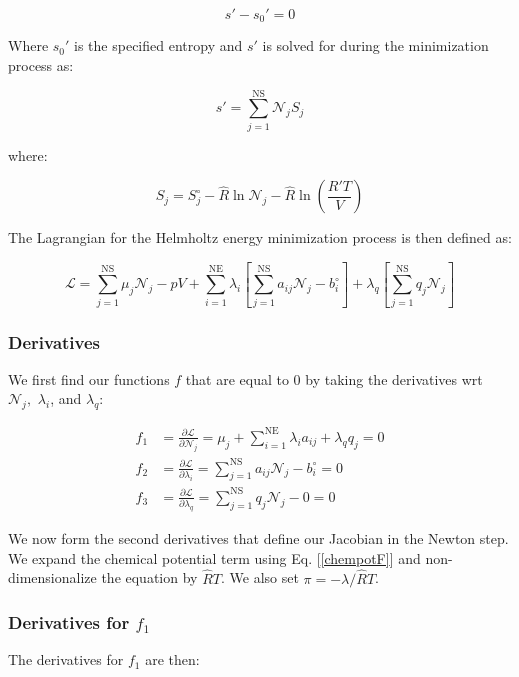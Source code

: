 \documentclass[10pt]{article}
\begin{document}
\begin{flushleft}
\begin{equation}
    s' - s_0' = 0
\end{equation}

Where $s_0'$ is the specified entropy and $s'$ is solved for during the minimization process as:

\begin{equation}
    s' = \sum_{j=1}^\text{NS} \mathcal{N}_j S_j
\end{equation}

where:

\begin{equation}
    S_j = S_j^\circ - \hat{R} \ln \mathcal{N}_j - \hat{R} \ln \left( \frac{R'T}{V}\right)
\end{equation}

 The Lagrangian for the Helmholtz energy minimization process is then defined as:

\begin{equation}
    \mathcal{L} = \sum_{j=1}^\text{NS} \mu_j \mathcal{N}_j - pV + \sum_{i=1}^\text{NE}\lambda_i \left[ \sum_{j=1}^\text{NS}a_{ij} \mathcal{N}_j - b_i^\circ \right] + \lambda_q \left[\sum_{j=1}^\text{NS} q_j \mathcal{N}_j\right]
    \label{helmholtzL}
\end{equation}

\subsubsection{Derivatives}
We first find our functions $f$ that are equal to 0 by taking the derivatives wrt $\mathcal{N}_j,$ $\lambda_i$, and $\lambda_q$:

\begin{align}
    f_1 &= \frac{\partial \mathcal{L}}{\partial \mathcal{N}_j} = \mu_j + \sum_{i=1}^\text{NE}\lambda_ia_{ij} + \lambda_q q_j = 0
    \\ f_2 &= \frac{\partial \mathcal{L}}{\partial \lambda_i} = \sum_{j=1}^\text{NS} a_{ij} \mathcal{N}_j - b_i^\circ= 0
    \\ f_3 &= \frac{\partial \mathcal{L}}{\partial \lambda_q} = \sum_{j=1}^\text{NS} q_j \mathcal{N}_j - 0= 0
\end{align}

We now form the second derivatives that define our Jacobian in the Newton step. We expand the chemical potential term using Eq. [\ref{chempotF}] and non-dimensionalize the equation by $\hat{R}T$. We also set $\pi = -\lambda/\hat{R}T$. 

\subsubsection{Derivatives for $f_1$}
The derivatives for $f_1$ are then:


\end{flushleft}
\end{document}
